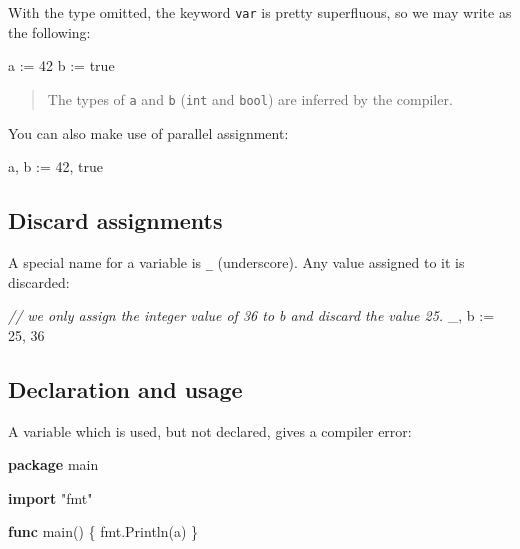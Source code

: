 \documentclass[]{book}
\newenvironment{Shaded}{\begin{snugshade}}{\end{snugshade}}
\newcommand{\CommentTok}[1]{\textcolor[rgb]{0.56,0.35,0.01}{\textit{#1}}}
\newcommand{\DecValTok}[1]{\textcolor[rgb]{0.00,0.00,0.81}{#1}}
\newcommand{\KeywordTok}[1]{\textcolor[rgb]{0.13,0.29,0.53}{\textbf{#1}}}
\newcommand{\NormalTok}[1]{#1}
\newcommand{\OtherTok}[1]{\textcolor[rgb]{0.56,0.35,0.01}{#1}}
\newcommand{\StringTok}[1]{\textcolor[rgb]{0.31,0.60,0.02}{#1}}
\begin{document}
With the type omitted, the keyword \texttt{var} is pretty superfluous, so we may write as the following:

\begin{Shaded}
\begin{Highlighting}[]
\NormalTok{a := }\DecValTok{42}
\NormalTok{b := }\OtherTok{true}
\end{Highlighting}
\end{Shaded}

\begin{quote}
The types of \texttt{a} and \texttt{b} (\texttt{int} and \texttt{bool}) are inferred by the compiler.
\end{quote}

You can also make use of parallel assignment:

\begin{Shaded}
\begin{Highlighting}[]
\NormalTok{a, b := }\DecValTok{42}\NormalTok{, }\OtherTok{true}
\end{Highlighting}
\end{Shaded}

\hypertarget{discard-assignments}{%
\subsection{Discard assignments}\label{discard-assignments}}

A special name for a variable is \texttt{\_} (underscore). Any value assigned to it is discarded:

\begin{Shaded}
\begin{Highlighting}[]
\CommentTok{// we only assign the integer value of 36 to b and discard the value 25.}
\NormalTok{_, b := }\DecValTok{25}\NormalTok{, }\DecValTok{36}
\end{Highlighting}
\end{Shaded}

\hypertarget{declaration-and-usage}{%
\subsection{Declaration and usage}\label{declaration-and-usage}}

A variable which is used, but not declared, gives a compiler error:

\begin{Shaded}
\begin{Highlighting}[]
\KeywordTok{package}\NormalTok{ main}

\KeywordTok{import} \StringTok{"fmt"}

\KeywordTok{func}\NormalTok{ main() \{}
\NormalTok{    fmt.Println(a)}
\NormalTok{\}}
\end{Highlighting}
\end{Shaded}
\end{document}
